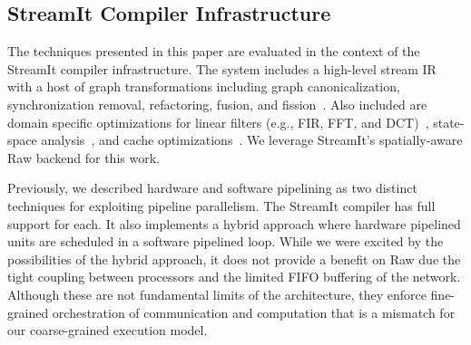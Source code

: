 



\subsection{StreamIt Compiler Infrastructure}
The techniques presented in this paper are evaluated in the context of
the StreamIt compiler infrastructure.  The system includes a
high-level stream IR with a host of graph transformations including
graph canonicalization, synchronization removal, refactoring, fusion,
and fission~\cite{streamit-asplos}.  Also included are domain specific
optimizations for linear filters (e.g., FIR, FFT, and
DCT)~\cite{lamb:pldi:2003}, state-space
analysis~\cite{agrawal:cases:2005}, and cache
optimizations~\cite{sermulins:lctes:2005}.  We leverage StreamIt's
spatially-aware Raw backend for this work.

Previously, we described hardware and software pipelining as two
distinct techniques for exploiting pipeline parallelism.  The StreamIt
compiler has full support for each.  It also implements a hybrid
approach where hardware pipelined units are scheduled in a software
pipelined loop.  While we were excited by the possibilities of the
hybrid approach, it does not provide a benefit on Raw due the tight
coupling between processors and the limited FIFO buffering of the
network. Although these are not fundamental limits of the
architecture, they enforce fine-grained orchestration of communication
and computation that is a mismatch for our coarse-grained execution
model.

